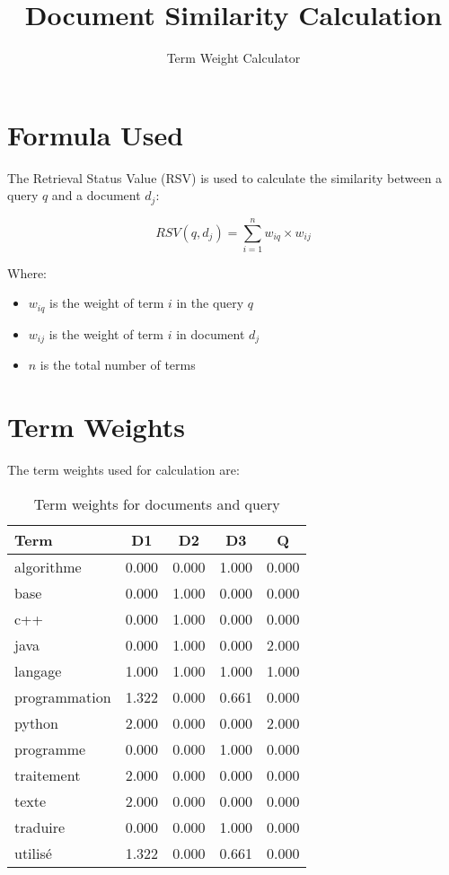\documentclass{article}
\begin{document}
\title{Document Similarity Calculation}
\author{Term Weight Calculator}
\maketitle

\section{Formula Used}
The Retrieval Status Value (RSV) is used to calculate the similarity between a query $q$ and a document $d_j$:

\begin{equation}
RSV(q, d_j) = \sum_{i=1}^{n} w_{iq} \times w_{ij}
\end{equation}

Where:
\begin{itemize}
\item $w_{iq}$ is the weight of term $i$ in the query $q$
\item $w_{ij}$ is the weight of term $i$ in document $d_j$
\item $n$ is the total number of terms
\end{itemize}

\section{Term Weights}
The term weights used for calculation are:

\begin{table}[h]
\centering
\begin{tabular}{lcccc}
\toprule
Term & D1 & D2 & D3 & Q \\
\midrule
algorithme & 0.000 & 0.000 & 1.000 & 0.000 \\
base & 0.000 & 1.000 & 0.000 & 0.000 \\
c++ & 0.000 & 1.000 & 0.000 & 0.000 \\
java & 0.000 & 1.000 & 0.000 & 2.000 \\
langage & 1.000 & 1.000 & 1.000 & 1.000 \\
programmation & 1.322 & 0.000 & 0.661 & 0.000 \\
python & 2.000 & 0.000 & 0.000 & 2.000 \\
programme & 0.000 & 0.000 & 1.000 & 0.000 \\
traitement & 2.000 & 0.000 & 0.000 & 0.000 \\
texte & 2.000 & 0.000 & 0.000 & 0.000 \\
traduire & 0.000 & 0.000 & 1.000 & 0.000 \\
utilis\'{e} & 1.322 & 0.000 & 0.661 & 0.000 \\
\bottomrule
\end{tabular}
\caption{Term weights for documents and query}
\end{table}
\end{document}
